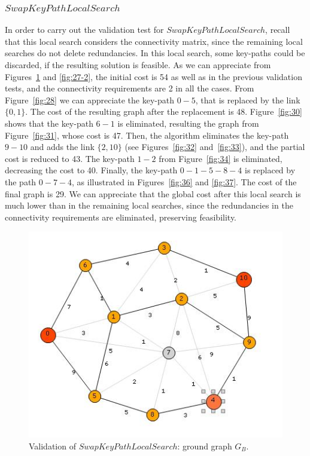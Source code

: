 \subsubsection{$SwapKeyPathLocalSearch$}
In order to carry out the validation test for $SwapKeyPathLocalSearch$, recall that this local search 
considers the connectivity matrix, since the remaining local searches do not delete redundancies. In this local search, some key-paths could be discarded, if the resulting solution is feasible. 
As we can appreciate from Figures~\ref{fig:27-1} and \ref{fig:27-2}, the initial cost is 54 as well as in the previous validation tests, and the connectivity requirements are 2 in all the cases. 
From Figure~\ref{fig:28} we can appreciate the key-path $0-5$, that is replaced by the link $\{0,1\}$. 
The cost of the resulting graph after the replacement is 48. 
Figure~\ref{fig:30} shows that the key-path $6-1$ is eliminated, resulting the graph from Figure~\ref{fig:31}, 
whose cost is 47. Then, the algorithm eliminates the key-path $9-10$ and adds the link $\{2,10\}$ 
(see Figures~\ref{fig:32} and~\ref{fig:33}), and the partial cost is reduced to 43. 
The key-path $1-2$ from Figure~\ref{fig:34} is eliminated, decreasing the cost to 40. Finally, the key-path 
$0-1-5-8-4$ is replaced by the path $0-7-4$, as illustrated in Figures~\ref{fig:36} and \ref{fig:37}. The cost 
of the final graph is 29. We can appreciate that the global cost after this local search is much lower than 
in the remaining local searches, since the redundancies in the connectivity requirements are eliminated, 
preserving feasibility.


\begin{figure}[H]
 \begin{center}
\includegraphics[scale=0.9]{27-1.jpg}
\caption{Validation of $SwapKeyPathLocalSearch$: ground graph $G_B$.}\label{fig:27-1}
 \end{center}
\end{figure}

